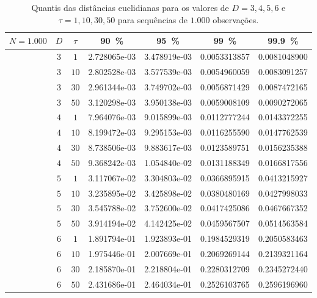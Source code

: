 \begin{table}[hbt]
	\centering
	\caption{Quantis das distâncias euclidianas para os valores de $D= 3, 4, 5, 6$ e $\tau=1, 10, 30, 50$ para sequências de $1.000$ observações.}\label{tab:dEuclid_1000}
	\begin{tabular}{ccccccc}
		\toprule
		$N=1.000$	&  $D$  &$\tau$  &\SI{90}{\percent}&\SI{95}{\percent}&\SI{99}{\percent}&\SI{99.9}{\percent}\\
		\midrule
		&  $3$ &  $ 1$ & 2.728065e-03  &  3.478919e-03  &  0.0053313857  &  0.0081048900 \\ 
		&  $3$ &  $10$ & 2.802528e-03  &  3.577539e-03  &  0.0054960059  &  0.0083091257 \\
		&  $3$ &  $30$ & 2.961344e-03  &  3.749702e-03  &  0.0056871429  &  0.0087472165 \\
		&  $3$ &  $50$ & 3.120298e-03  &  3.950138e-03  &  0.0059008109  &  0.0090272065 \\
		\midrule
		&  $4$ &  $ 1$ & 7.964076e-03  &  9.015899e-03  &  0.0112777244  &  0.0143372255 \\ 
		&  $4$ &  $10$ & 8.199472e-03  &  9.295153e-03  &  0.0116255590  &  0.0147762539 \\
		&  $4$ &  $30$ & 8.738506e-03  &  9.883617e-03  &  0.0123589751  &  0.0156235388 \\
		&  $4$ &  $50$ & 9.368242e-03  &  1.054840e-02  &  0.0131188349  &  0.0166817556 \\
		\midrule
		&  $5$ &  $ 1$ & 3.117067e-02  &  3.304803e-02  &  0.0366895915  &  0.0413215927 \\ 
		&  $5$ &  $10$ & 3.235895e-02  &  3.425898e-02  &  0.0380480169  &  0.0427998033 \\
		&  $5$ &  $30$ & 3.545788e-02  &  3.752600e-02  &  0.0417425086  &  0.0467667352 \\
		&  $5$ &  $50$ & 3.914194e-02  &  4.142425e-02  &  0.0459567507  &  0.0514563584 \\
		\midrule
		&  $6$ &  $ 1$ & 1.891794e-01  &  1.923893e-01  &  0.1984529319  &  0.2050583463 \\
		&  $6$ &  $10$ & 1.975446e-01  &  2.007669e-01  &  0.2069269144  &  0.2139321164 \\
		&  $6$ &  $30$ & 2.185870e-01  &  2.218804e-01  &  0.2280312709  &  0.2345272440 \\
		&  $6$ &  $50$ & 2.431686e-01  &  2.464034e-01  &  0.2526103765  &  0.2596196960 \\
		\bottomrule
	\end{tabular}
\end{table}

